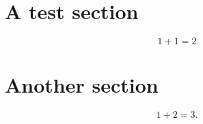 \documentclass{article}
\begin{document}
\section{A test section}
\begin{equation}
1+1=2
\end{equation}
\section{Another section}
\begin{equation}
1+2=3.
\end{equation}
\end{document}
